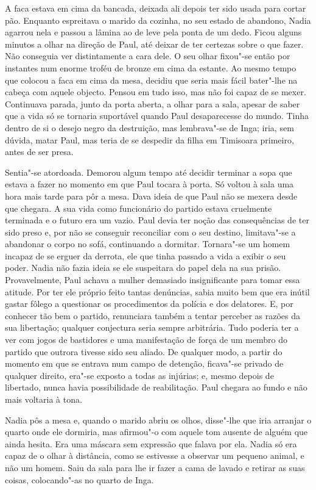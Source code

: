 A faca estava em cima da bancada, deixada ali depois ter sido usada para
cortar pão. Enquanto espreitava o marido da cozinha, no seu estado de
abandono, Nadia agarrou nela e passou a lâmina ao de leve pela ponta de
um dedo. Ficou alguns minutos a olhar na direção de Paul, até deixar de
ter certezas sobre o que fazer. Não conseguia ver distintamente a cara
dele. O seu olhar fixou"-se então por instantes num enorme troféu de
bronze em cima da estante. Ao mesmo tempo que colocou a faca em cima da
mesa,
decidiu que seria mais fácil bater"-lhe na cabeça com aquele objecto.
Pensou em tudo isso, mas não foi capaz de se mexer. Continuava parada,
junto da porta aberta, a olhar para a sala, apesar de saber que a vida
só se tornaria suportável quando Paul desaparecesse do mundo. Tinha
dentro de si o desejo negro da destruição, mas lembrava"-se de Inga;
iria, sem dúvida, matar Paul, mas teria de se despedir da filha em
Timisoara primeiro, antes de ser presa.

Sentia"-se atordoada. Demorou algum tempo até decidir terminar a sopa que
estava a fazer no momento em que Paul tocara à porta. Só voltou à sala
uma hora mais tarde para pôr a mesa. Dava ideia de que Paul não se
mexera desde que chegara. A sua vida como funcionário do partido
estava cruelmente terminada e o futuro era um vazio. Paul devia ter
noção das consequências de ter sido preso e, por não se conseguir
reconciliar com o seu destino, limitava"-se a abandonar o corpo no sofá,
continuando a dormitar. Tornara"-se um homem incapaz de se erguer da
derrota, ele que tinha passado a vida a exibir o seu poder. Nadia não
fazia ideia se ele suspeitara do papel dela na sua prisão.
Provavelmente, Paul achava a mulher demasiado insignificante para
tomar essa atitude. Por ter ele próprio feito tantas denúncias, sabia
muito bem que era inútil gastar fôlego a questionar os procedimentos da
polícia e dos delatores. E, por conhecer tão bem o partido, renunciara
também a tentar perceber as razões da sua libertação; qualquer
conjectura seria sempre arbitrária. Tudo poderia ter a ver com jogos de
bastidores e uma manifestação de força de um membro do partido que
outrora tivesse sido seu aliado. De qualquer modo, a partir do momento em que se entrava num campo de detenção, ficava"-se
privado de qualquer direito, era"-se exposto a todas as injúrias; e,
mesmo depois de libertado, nunca havia possibilidade de reabilitação.
Paul chegara ao fundo e não mais voltaria à tona.

Nadia pôs a mesa e, quando o marido abriu os olhos, disse"-lhe que iria
arranjar o quarto onde ele dormiria, mas afirmou"-o com aquele tom
ausente de alguém que ainda hesita. Era uma máscara sem expressão que
falava por ela. Nadia só era capaz de o olhar à distância, como se estivesse a observar um pequeno animal, e não um homem. Saiu da sala para
lhe ir fazer a cama de lavado e retirar as suas coisas, colocando"-as no
quarto de Inga.

